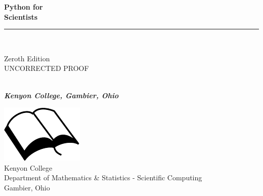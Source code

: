 \documentclass{book}
\makeatletter
\newcommand{\bookprinttitle}{Python for\\Scientists}
\newcommand{\booksubtitle}{Introduction to Python for Scientific Computing}
\newcommand{\authorsubtitle}{Kenyon College, Gambier, Ohio}
\newcommand{\bookauthor}{\@author}
\makeatother
\begin{document}

\restoregeometry


\thispagestyle{empty}


\begin{titlepage}
\begin{flushleft}

\textbf{\fontsize{48}{54}\selectfont \bookprinttitle}

\par\noindent\rule{\textwidth}{4pt}\\


\begin{flushright}
\Large Zeroth Edition\\UNCORRECTED PROOF
\end{flushright}

\vspace{\fill}

\textbf{\large \bookauthor}\\[3.5pt]
\textbf{\large \textit{\authorsubtitle}}

\vspace{\fill}

\begin{center}
\includegraphics{img/booksvg.pdf}\\[4pt]
\small{Kenyon College\\
Department of Mathematics \& Statistics - Scientific Computing\\
Gambier, Ohio}
\end{center}

\end{flushleft}
\end{titlepage}
\restoregeometry
\end{document}
